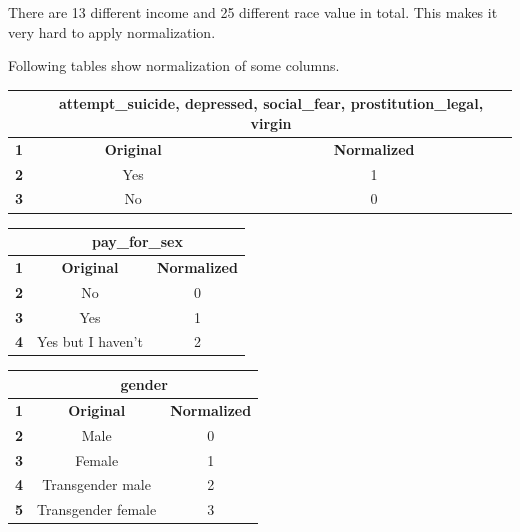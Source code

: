 \documentclass{article}
\begin{document}
There are 13 different income and 25 different race value in total. This makes it very hard to apply normalization.

Following tables show normalization of some columns.
\begin{table}[H]
\begin{center}
\begin{tabular}{|c|c|c|}
\hline
\textbf{}  & \multicolumn{2}{c|}{\textbf{attempt\_suicide, depressed, social\_fear, prostitution\_legal, virgin}} \\ \hline
\textbf{1} & \textbf{Original}     & \textbf{Normalized}                               \\ \hline
\textbf{2} & Yes   & 1                                                 \\ \hline
\textbf{3} & No   & 0                                                 \\ \hline
\end{tabular}
\end{center}
\end{table}

\begin{table}[H]
\begin{center}
\begin{tabular}{|c|c|c|}
\hline
\textbf{}  & \multicolumn{2}{c|}{\textbf{pay\_for\_sex}} \\ \hline
\textbf{1} & \textbf{Original}   & \textbf{Normalized}   \\ \hline
\textbf{2} & No                  & 0                     \\ \hline
\textbf{3} & Yes                 & 1                     \\ \hline
\textbf{4} & Yes but I haven't   & 2                     \\ \hline
\end{tabular}
\end{center}
\end{table}

\begin{table}[H]
\begin{center}
\begin{tabular}{|c|c|c|}
\hline
\textbf{}  & \multicolumn{2}{c|}{\textbf{gender}}     \\ \hline
\textbf{1} & \textbf{Original}  & \textbf{Normalized} \\ \hline
\textbf{2} & Male               & 0                   \\ \hline
\textbf{3} & Female             & 1                   \\ \hline
\textbf{4} & Transgender male   & 2                   \\ \hline
\textbf{5} & Transgender female & 3                   \\ \hline
\end{tabular}
\end{center}
\end{table}
\end{document}
